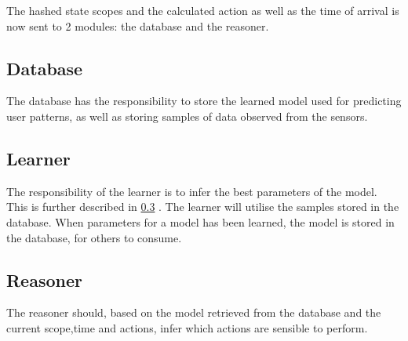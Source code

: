 The hashed state scopes and the calculated action as well as the time of arrival is now sent to 2 modules: the database and the reasoner.

\subsection{Database}
The database has the responsibility to store the learned model used for predicting user patterns, as well as storing samples of data observed from the sensors.

\subsection{Learner}
The responsibility of the learner is to infer the best parameters of the model. This is further described in \cref{} . The learner will utilise the samples stored in the database. When parameters for a model has been learned, the model is stored in the database, for others to consume.

\subsection{Reasoner}
The reasoner should, based on the model retrieved from the database and the current scope,time and actions, infer which actions are sensible  to perform.
